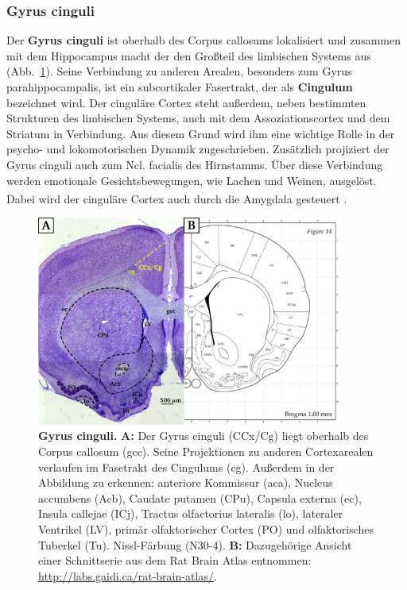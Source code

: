 \subsubsection*{Gyrus cinguli}  
Der \textbf{Gyrus cinguli} ist oberhalb des Corpus callosums lokalisiert und zusammen mit dem Hippocampus macht der den Großteil des limbischen Systems aus (Abb.~\ref{fig:cingulaerer_Cortex}). Seine Verbindung zu anderen Arealen, besonders zum Gyrus parahippocampalis, ist ein subcortikaler Fasertrakt, der als \textbf{Cingulum} bezeichnet wird. Der cinguläre Cortex steht außerdem, neben bestimmten Strukturen des limbischen Systems, auch mit dem Assoziationscortex und dem Striatum in Verbindung. Aus diesem Grund wird ihm eine wichtige Rolle in der psycho- und lokomotorischen Dynamik zugeschrieben. Zusätzlich projiziert der Gyrus cinguli auch zum Ncl. facialis des Hirnstamms. Über diese Verbindung werden emotionale Gesichtsbewegungen, wie Lachen und Weinen, ausgelöst. Dabei wird der cinguläre Cortex auch durch die Amygdala gesteuert \textsuperscript{\cite[Kap.~9]{trepel2011neuroanatomie}}.

\begin{figure}[H]
    \centering
    \includegraphics[width=0.9\textwidth]{pictures/Basalganglia/cingulaerer_Cortex.png}
    \caption[Gyrus cinguli]{\textbf{Gyrus cinguli.} \textbf{A:} Der Gyrus cinguli (CCx/Cg) liegt oberhalb des Corpus callosum (gcc). Seine Projektionen zu anderen Cortexarealen verlaufen im Fasetrakt des Cingulums (cg). Außerdem in der Abbildung zu erkennen: anteriore Kommissur (aca), Nucleus accumbens (Acb), Caudate putamen (CPu), Capsula externa (ec), Insula callejae (ICj), Tractus olfactorius lateralis (lo), lateraler Ventrikel (LV), primär olfaktorischer Cortex (PO) und olfaktorisches Tuberkel (Tu). Nissl-Färbung (N30-4). \textbf{B:} Dazugehörige Ansicht einer Schnittserie aus dem Rat Brain Atlas entnommen: \url{http://labs.gaidi.ca/rat-brain-atlas/}.}
    \label{fig:cingulaerer_Cortex}
\end{figure}

